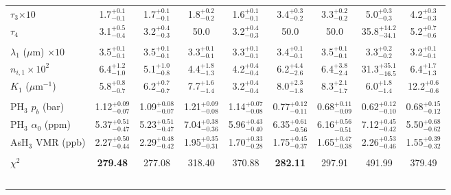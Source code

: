 \documentclass[article,11pt]{emulateapj}
\def\asht{AsH$_3$ }
\def\mumx{$\mu$m}
\def\pht{PH$_3$ }
\begin{document}
\begin{table*}[!htb]
\begin{footnotesize}
\begin{tabular}{|l|c c c c|c c c c|}
    $\tau_3$$\times 10$ &   1.7$^{+  0.1}_{-  0.1}$ &   1.7$^{+ 0.1}_{- 0.1}$ &   1.8$^{+ 0.2}_{- 0.2}$ &   1.6$^{+ 0.1}_{- 0.1}$ &   3.4$^{+ 0.3}_{- 0.2}$ &   3.3$^{+ 0.2}_{- 0.2}$ &   5.0$^{+ 0.3}_{- 0.3}$ &   4.2$^{+ 0.3}_{- 0.3}$\\[0.05in]
                 $\tau_4$ &   3.1$^{+  0.5}_{-  0.4}$ &   3.2$^{+ 0.4}_{- 0.3}$ &  50.0                  &   3.2$^{+ 0.4}_{- 0.3}$ &  50.0                &  50.0                 &  35.8$^{+14.2}_{-34.1}$ &   5.2$^{+ 0.7}_{- 0.6}$\\[0.05in]
\hline\\[-0.1in]
  $\lambda_1$ (\mumx) $ \times 10$&   3.5$^{+  0.1}_{-  0.1}$ &   3.5$^{+ 0.1}_{- 0.1}$ &   3.3$^{+ 0.1}_{- 0.1}$ &   3.3$^{+ 0.1}_{- 0.1}$ &   3.4$^{+ 0.1}_{- 0.1}$ &   3.5$^{+ 0.1}_{- 0.1}$ &   3.3$^{+ 0.2}_{- 0.2}$ &   3.2$^{+ 0.1}_{- 0.1}$\\[0.05in]
       $n_{i,1} \times 10^2$ &   6.4$^{+  1.2}_{-  1.0}$ &   5.1$^{+ 1.0}_{- 0.8}$ &   4.4$^{+ 1.8}_{- 1.3}$ &   4.2$^{+ 0.4}_{- 0.4}$ &   6.2$^{+ 4.4}_{- 2.6}$ &   6.4$^{+ 3.8}_{- 2.4}$ &  31.3$^{+35.1}_{-16.5}$ &   6.4$^{+ 1.7}_{- 1.3}$\\[0.05in]
      $K_1$ (\mumx$^{-1}$) &   5.8$^{+  0.8}_{-  0.7}$ &   6.2$^{+ 0.7}_{- 0.7}$ &   7.7$^{+ 1.6}_{- 1.4}$ &   3.2$^{+ 0.4}_{- 0.4}$ &   8.0$^{+ 2.3}_{- 1.8}$ &   8.3$^{+ 2.1}_{- 1.7}$ &   6.0$^{+ 1.8}_{- 1.4}$ &  12.2$^{+ 0.6}_{- 0.6}$\\[0.05in]
\hline\\[-0.1in]
           \pht $p_b$ (bar) &  1.12$^{+ 0.09}_{- 0.07}$ &  1.09$^{+0.08}_{-0.07}$ &  1.21$^{+0.09}_{-0.08}$ &  1.14$^{+0.07}_{-0.08}$ &  0.77$^{+0.12}_{-0.11}$ &  0.68$^{+0.11}_{-0.09}$ &  0.62$^{+0.12}_{-0.10}$ &  0.68$^{+0.15}_{-0.12}$\\[0.05in]
     \pht $\alpha_0$  (ppm) &  5.37$^{+ 0.51}_{- 0.47}$ &  5.23$^{+0.51}_{-0.47}$ &  7.04$^{+0.38}_{-0.36}$ &  5.96$^{+0.43}_{-0.40}$ &  6.35$^{+0.61}_{-0.56}$ &  6.16$^{+0.56}_{-0.51}$ &  7.12$^{+0.45}_{-0.42}$ &  5.50$^{+0.68}_{-0.62}$\\[0.05in]
 \asht VMR (ppb) &  2.27$^{+ 0.50}_{- 0.44}$ &  2.29$^{+0.48}_{-0.42}$ &  1.95$^{+0.35}_{-0.31}$ &  1.70$^{+0.33}_{-0.28}$ &  1.75$^{+0.45}_{-0.37}$ &  1.65$^{+0.47}_{-0.38}$ &  2.26$^{+0.53}_{-0.46}$ &  1.55$^{+0.39}_{-0.32}$\\[0.05in]
 \hline\\[-0.1in]
$\chi^2$ &   {\bf279.48} & 277.08 & 318.40 & 370.88 & {\bf  282.11} & 297.91 & 491.99 & 379.49\\[0.05in]
$$
\end{tabular}
\end{footnotesize}
\end{table*}
\end{document}
